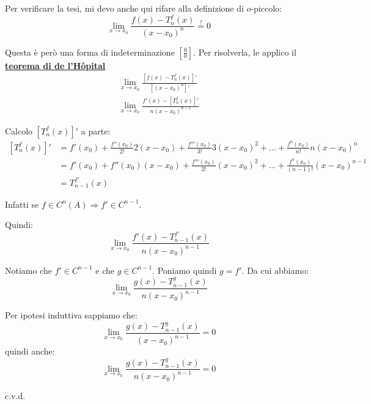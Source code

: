 \documentclass[../../dimostrazioni]{subfiles}
\begin{document}
                Per verificare la tesi, mi devo anche qui rifare alla definizione di \(o\)-piccolo:
                \[\lim_{x \to x_0} \frac{f(x)-T _n ^ f (x)}{(x-x_0)^n} \stackrel{?}{=} 0\]

                Questa è però una forma di indeterminazione \(\left[\frac{0}{0}\right]\). Per risolverla, le applico il \textbf{\hyperref[teoHopital]{teorema di de l'Hôpital}}
                \begin{gather*}
                    \lim_{x \to x_0} \frac{\left[f(x)-T _n ^ f (x)\right]'}{\left[(x-x_0)^n\right]'}\\
                    \lim_{x \to x_0} \frac{f'(x)-\left[T _n ^ f (x)\right]'}{n(x-x_0)^{n-1}}
                \end{gather*}

                Calcolo \(\left[T _n ^ f (x)\right]'\) a parte:
                \begin{align*}
                    \left[T _n ^ f (x)\right]' &= f'(x_0) + \frac{f''(x_0)}{2!}2(x-x_0) + \frac{f'''(x_0)}{3!}3(x-x_0)^2 + \dots + \frac{f^n(x_0)}{n!}n(x-x_0)^n \\
                                            &= f'(x_0) + f''(x_0)(x-x_0) + \frac{f'''(x_0)}{2!}(x-x_0)^2 + \dots + \frac{f^n(x_0)}{(n-1)!}(x-x_0)^{n-1} \\
                                            &= T_{n-1} ^{f'} (x)
                \end{align*}

                Infatti se \(f \in C^n (A) \Rightarrow f' \in C^{n-1} \).

                Quindi:
                \[  \lim_{x \to x_0} \frac{f'(x)-T_{n-1} ^{f'} (x)}{n(x-x_0)^{n-1}}    \]

                Notiamo che \(f' \in C^{n-1}\) e che \(g \in C^{n-1}\). Poniamo quindi \(g = f'\). Da cui abbiamo:
                \[  \lim_{x \to x_0} \frac{g(x)-T_{n-1} ^{g} (x)}{n(x-x_0)^{n-1}}    \]

                Per ipotesi induttiva sappiamo che:
                \[  \lim_{x \to x_0} \frac{g(x) - T _{n - 1} ^ g (x)}{(x-x_0)^{n-1}} = 0 \]
                quindi anche:
                \[  \lim_{x \to x_0} \frac{g(x)-T_{n-1} ^{g} (x)}{n(x-x_0)^{n-1}}  = 0  \]

                c.v.d.
\end{document}
